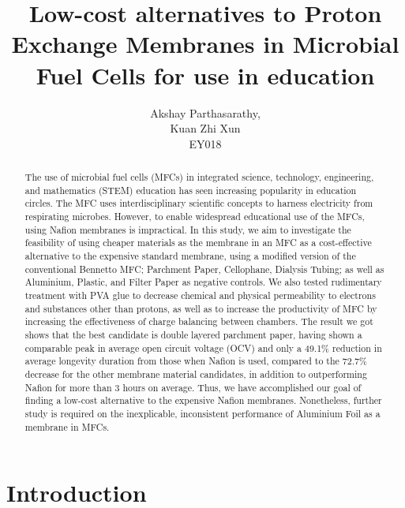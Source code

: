 \documentclass[12pt, twocolumn, a4paper]{article}
\title{\textbf{%
Low-cost alternatives to Proton Exchange Membranes in Microbial Fuel Cells for use in education}}
\author{Akshay Parthasarathy, \\ Kuan Zhi Xun \\ EY018
}
\date{}
\begin{document}
\maketitle
\begin{abstract}
    The use of microbial fuel cells (MFCs) in integrated science, technology, engineering, and mathematics (STEM) education has seen increasing popularity in education circles. The MFC uses interdisciplinary scientific concepts to harness electricity from respirating microbes. However, to enable widespread educational use of the MFCs, using Nafion\texttrademark{} membranes is impractical. In this study, we aim to investigate the feasibility of using cheaper materials as the membrane in an MFC as a cost-effective alternative to the expensive standard membrane, using a modified version of the conventional Bennetto MFC; Parchment Paper, Cellophane, Dialysis Tubing; as well as Aluminium, Plastic, and Filter Paper as negative controls. We also tested rudimentary treatment with PVA glue to decrease chemical and physical permeability to electrons and substances other than protons, as well as to increase the productivity of MFC by increasing the effectiveness of charge balancing between chambers. The result we got shows that the best candidate is double layered parchment paper, having shown a comparable peak in average open circuit voltage (OCV) and only a 49.1\% reduction in average longevity duration from those when Nafion\texttrademark{} is used, compared to the 72.7\% decrease for the other membrane material candidates, in addition to outperforming Nafion\texttrademark{} for more than 3 hours on average. Thus, we have accomplished our goal of finding a low-cost alternative to the expensive Nafion\texttrademark{} membranes. Nonetheless, further study is required on the inexplicable, inconsistent performance of Aluminium Foil as a membrane in MFCs.
\end{abstract}
\section{Introduction}
\end{document}
